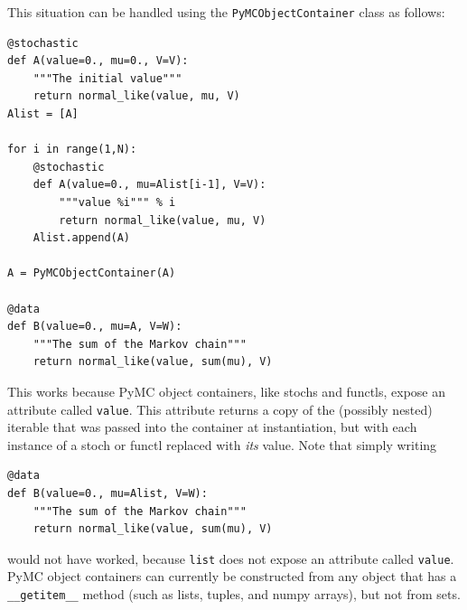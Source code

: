 \documentclass[]{book}
\begin{document}
This situation can be handled using the \texttt{PyMCObjectContainer} class as follows:
\begin{verbatim}
@stochastic
def A(value=0., mu=0., V=V):
    """The initial value"""
    return normal_like(value, mu, V)
Alist = [A]

for i in range(1,N):
    @stochastic
    def A(value=0., mu=Alist[i-1], V=V):
        """value %i""" % i
        return normal_like(value, mu, V)
    Alist.append(A)
    
A = PyMCObjectContainer(A)

@data
def B(value=0., mu=A, V=W):
    """The sum of the Markov chain"""
    return normal_like(value, sum(mu), V)   
\end{verbatim}
This works because PyMC object containers, like stochs and functls, expose an attribute called \texttt{value}. This attribute returns a copy of the (possibly nested) iterable that was passed into the container at instantiation, but with each instance of a stoch or functl replaced with \emph{its} value. Note that simply writing
\begin{verbatim}
@data
def B(value=0., mu=Alist, V=W):
	"""The sum of the Markov chain"""
	return normal_like(value, sum(mu), V)	
\end{verbatim}
would not have worked, because \texttt{list} does not expose an attribute called \texttt{value}. PyMC object containers can currently be constructed from any object that has a \texttt{\_\_getitem\_\_} method (such as lists, tuples, and numpy arrays), but not from sets.
\end{document}
